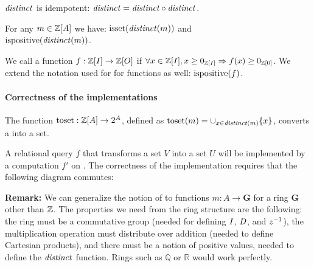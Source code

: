 \begin{proposition}
$\mathit{distinct}$ is idempotent: $\mathit{distinct} = \mathit{distinct} \circ \mathit{distinct}$.
\end{proposition}

\begin{proposition}
For any $m \in \mathbb{Z}[A]$ we have: $\mbox{isset}(\mathit{distinct}(m))$ and \\
$\mbox{ispositive}(\mathit{distinct}(m))$.
\end{proposition}

We call a function $f : \mathbb{Z}[I] \rightarrow \mathbb{Z}[O]$  if
$\forall x \in \mathbb{Z}[I], x \geq 0_{\mathbb{Z}[I]} \Rightarrow f(x) \geq 0_{\mathbb{Z}[0]}$.
We extend the notation used for \zrs for functions as well: $\mbox{ispositive}(f)$.

\paragraph{Correctness of the \dbsp implementations}

The function $\mbox{toset}: \mathbb{Z}[A] \to 2^A$, defined as $\mbox{toset}(m) =
\cup_{x \in \mathit{distinct}(m)} \{ x \}$, converts a \zr into a set.

A relational query $f$ that transforms
a set $V$ into a set $U$ will be implemented by a \dbsp computation $f'$ on
\zrs.  The correctness of the implementation requires that the following
diagram commutes:

\begin{center}
\end{center}

\textbf{Remark:} We can generalize the notion of \zrs to functions $m: A \to \mathbf{G}$ for a
ring $\mathbf{G}$ other than $\mathbb{Z}$.  The properties we need from the ring structure are the
following: the ring must be a commutative group (needed for defining $\mathit{I}$, $\mathit{D}$, and $z^{-1}$),
the multiplication operation must distribute over addition (needed to define
Cartesian products), and there must be a notion of positive values, needed
to define the $\mathit{distinct}$ function.  Rings such as $\mathbb{Q}$ or $\mathbb{R}$
would work perfectly.

